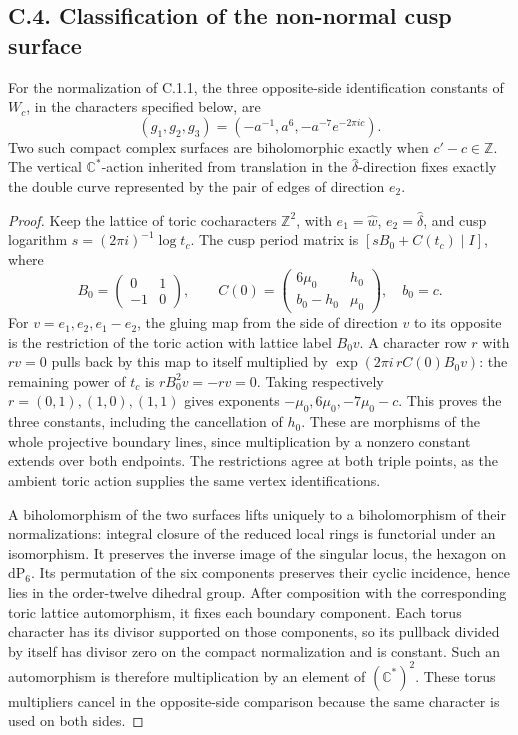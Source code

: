 \subsection{C.4. Classification of the non-normal cusp surface}
\begin{theorem}[C.4.1; Proved]\label{st:C.4.1}
For the normalization of C.1.1, the three opposite-side identification
constants of \(W_c\), in the characters specified below, are
\[
 (g_1,g_2,g_3)=(-a^{-1},a^6,-a^{-7}e^{-2\pi ic}).
\]
Two such compact complex surfaces are biholomorphic exactly when
\(c'-c\in\mathbb Z\). The vertical \(\mathbb C^*\)-action inherited from
translation in the \(\widehat\delta\)-direction fixes exactly the double
curve represented by the pair of edges of direction \(e_2\).
\end{theorem}
\begin{proof}
Keep the lattice of toric cocharacters \(\mathbb Z^2\), with
\(e_1=\widehat w\), \(e_2=\widehat\delta\), and cusp logarithm
\(s=(2\pi i)^{-1}\log t_c\). The cusp period matrix is
\([sB_0+C(t_c)\mid I]\), where
\[
 B_0=\begin{pmatrix}0&1\\-1&0\end{pmatrix},\qquad
 C(0)=\begin{pmatrix}6\mu_0&h_0\\b_0-h_0&\mu_0\end{pmatrix},
 \quad b_0=c.
\]
For \(v=e_1,e_2,e_1-e_2\), the gluing map from the side of direction
\(v\) to its opposite is the restriction of the toric action with lattice
label \(B_0v\). A character row \(r\) with \(rv=0\) pulls back by this
map to itself multiplied by
\(\exp(2\pi i\,rC(0)B_0v)\): the remaining power of \(t_c\) is
\(rB_0^2v=-rv=0\). Taking respectively
\(r=(0,1),(1,0),(1,1)\) gives exponents
\(-\mu_0,6\mu_0,-7\mu_0-c\). This proves the three constants, including
the cancellation of \(h_0\). These are morphisms of the whole projective
boundary lines, since multiplication by a nonzero constant extends over
both endpoints. The restrictions agree at both triple points, as the
ambient toric action supplies the same vertex identifications.

A biholomorphism of the two surfaces lifts uniquely to a biholomorphism
of their normalizations: integral closure of the reduced local rings is
functorial under an isomorphism. It preserves the inverse image of the
singular locus, the hexagon on \(\mathrm{dP}_6\). Its permutation of the
six components preserves their cyclic incidence, hence lies in the
order-twelve dihedral group. After composition with the corresponding
toric lattice automorphism, it fixes each boundary component. Each torus
character has its divisor supported on those components, so its pullback
divided by itself has divisor zero on the compact normalization and is
constant. Such an automorphism is therefore multiplication by an element
of \((\mathbb C^*)^2\). These torus multipliers cancel in the opposite-side
comparison because the same character is used on both sides.


\end{proof}
